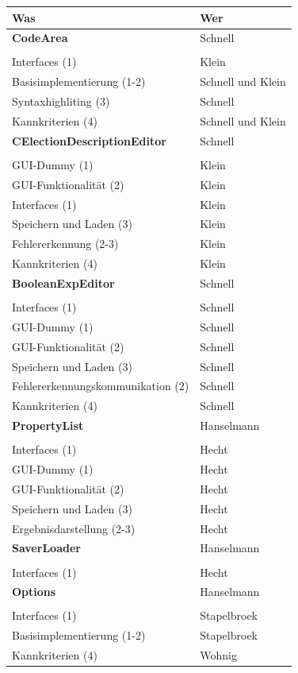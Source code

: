 \documentclass[a4paper]{scrreprt}
\begin{document}
\begin{tabular}{ | p{7cm} | p{7cm} |}
    \hline
	Was & Wer\\
	\hline
	
	\rule{0pt}{15pt}\textbf {CodeArea} & Schnell\\
	&\\
	\hline
	Interfaces (1) & Klein\\
	\hline
	Basisimplementierung (1-2) & Schnell und Klein\\
	\hline
	Syntaxhighliting (3) & Schnell \\
	\hline
	Kannkriterien (4) & Schnell und Klein \\
	\hline
	
	\rule{0pt}{15pt}\textbf {CElectionDescriptionEditor} & Schnell\\
	&\\
	\hline
	GUI-Dummy (1) & Klein \\
	\hline
	GUI-Funktionalität (2) & Klein\\
	\hline
	Interfaces (1) & Klein\\
	\hline
	Speichern und Laden (3) & Klein\\
	\hline
	Fehlererkennung (2-3)& Klein\\
	\hline
	Kannkriterien (4) & Klein\\
	\hline
	
	\rule{0pt}{15pt}\textbf {BooleanExpEditor} &  Schnell \\
	&\\
	\hline
	Interfaces (1) & Schnell\\
	\hline
	GUI-Dummy (1) & Schnell\\
	\hline
	GUI-Funktionalität (2) & Schnell\\
	\hline
	Speichern und Laden (3) & Schnell\\
	\hline	
	Fehlererkennungskommunikation (2) & Schnell\\
	\hline
	Kannkriterien (4) & Schnell\\
	\hline
	
	\rule{0pt}{15pt}\textbf {PropertyList} & Hanselmann\\
	&\\
	\hline
	Interfaces (1) & Hecht\\
	\hline
	GUI-Dummy (1) & Hecht\\
	\hline
	GUI-Funktionalität (2) & Hecht\\
	\hline
	Speichern und Laden (3)& Hecht\\
	\hline
	Ergebnisdarstellung (2-3) & Hecht\\
	\hline	
	\rule{0pt}{15pt}\textbf {SaverLoader} & Hanselmann\\
	&\\
	\hline
	Interfaces (1) & Hecht\\
	\hline
	\rule{0pt}{15pt}\textbf {Options} & Hanselmann\\
	&\\
	\hline
	Interfaces (1) & Stapelbroek\\
	\hline
	Basisimplementierung (1-2) & Stapelbroek\\
	\hline
	Kannkriterien (4) & Wohnig \\
	\hline
	
\end{tabular}\\
\end{document}
